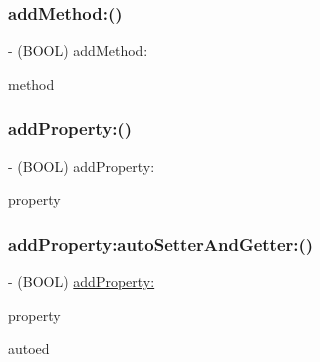 \subsubsection{\texorpdfstring{add\+Method\+:()}{addMethod:()}}
{\footnotesize\ttfamily -\/ (B\+O\+OL) add\+Method\+: \begin{DoxyParamCaption}\item[{(\hyperlink{interface_m_a_r_method}{M\+A\+R\+Method} $\ast$)}]{method }\end{DoxyParamCaption}}

\mbox{\label{interface_m_a_r_unregistered_class_afe38f5df71ee6cdcdf4b890b4d1c5a43}} 
\subsubsection{\texorpdfstring{add\+Property\+:()}{addProperty:()}}
{\footnotesize\ttfamily -\/ (B\+O\+OL) add\+Property\+: \begin{DoxyParamCaption}\item[{(\hyperlink{interface_m_a_r_property}{M\+A\+R\+Property} $\ast$)}]{property }\end{DoxyParamCaption}}

\mbox{\label{interface_m_a_r_unregistered_class_ae488ab11298cf080a4e69df914a0089f}} 
\subsubsection{\texorpdfstring{add\+Property\+:auto\+Setter\+And\+Getter\+:()}{addProperty:autoSetterAndGetter:()}}
{\footnotesize\ttfamily -\/ (B\+O\+OL) \hyperlink{interface_m_a_r_unregistered_class_afe38f5df71ee6cdcdf4b890b4d1c5a43}{add\+Property\+:} \begin{DoxyParamCaption}\item[{(\hyperlink{interface_m_a_r_property}{M\+A\+R\+Property} $\ast$)}]{property }\item[{autoSetterAndGetter:(B\+O\+OL)}]{autoed }\end{DoxyParamCaption}}

